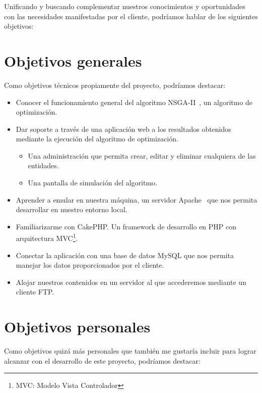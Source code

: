 
Unificando y buscando complementar nuestros conocimientos y oportunidades con las necesidades manifestadas por el cliente, podríamos hablar de los siguientes objetivos:

\section{Objetivos generales}

Como objetivos técnicos propiamente del proyecto, podríamos destacar:

\begin{itemize}
	\item Conocer el funcionamiento general del algoritmo NSGA-II~\cite{pdf:nsga-ii}, un algoritmo de optimización.
	
	\item Dar soporte a través de una aplicación web a los resultados obtenidos mediante la ejecución del algoritmo de optimización.
	\begin{itemize}
		\item Una administración que permita crear, editar y eliminar cualquiera de las entidades.
		\item Una pantalla de simulación del algoritmo.
	\end{itemize}
	\item Aprender a emular en nuestra máquina, un servidor Apache~\cite{libro:apache} que nos permita desarrollar en nuestro entorno local.
	
	\item Familiarizarme con CakePHP. Un framework de desarrollo en PHP con arquitectura MVC\cite{libro:patrones}\footnote{MVC: Modelo Vista Controlador}.
	
	\item Conectar la aplicación con una base de datos MySQL que nos permita manejar los datos proporcionados por el cliente.
	
	\item Alojar nuestros contenidos en un servidor al que accederemos mediante un cliente FTP.
\end{itemize}

\section{Objetivos personales}

Como objetivos quizá más personales que también me gustaría incluir para lograr alcanzar con el desarrollo de este proyecto, podríamos destacar:

